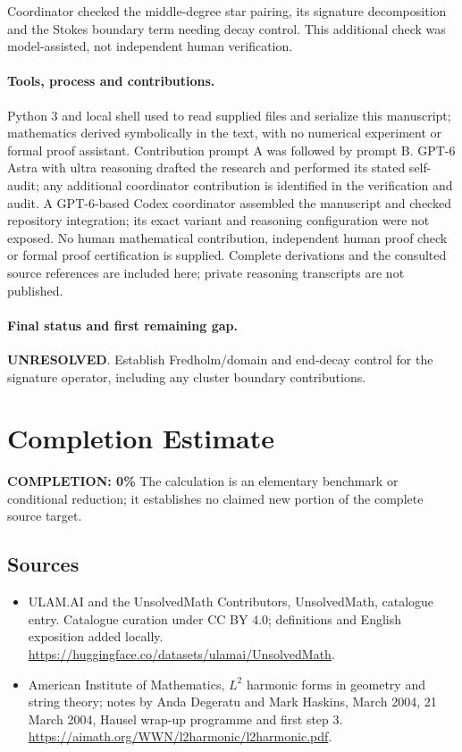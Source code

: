 \documentclass[11pt]{article}
\begin{document}
Coordinator checked the middle-degree star pairing, its signature decomposition and the Stokes boundary term needing decay control. This additional check was model-assisted, not independent human verification.

\paragraph{Tools, process and contributions.}
Python 3 and local shell used to read supplied files and serialize this manuscript; mathematics derived symbolically in the text, with no numerical experiment or formal proof assistant. Contribution prompt A was followed by prompt B. GPT-6 Astra with ultra reasoning drafted the research and performed its stated self-audit; any additional coordinator contribution is identified in the verification and audit. A GPT-6-based Codex coordinator assembled the manuscript and checked repository integration; its exact variant and reasoning configuration were not exposed. No human mathematical contribution, independent human proof check or formal proof certification is supplied. Complete derivations and the consulted source references are included here; private reasoning transcripts are not published.

\paragraph{Final status and first remaining gap.}
\textbf{UNRESOLVED}. Establish Fredholm/domain and end-decay control for the signature operator, including any cluster boundary contributions.

\section{Completion Estimate}
\noindent\textbf{COMPLETION: 0\%}
The calculation is an elementary benchmark or conditional reduction; it establishes no claimed new portion of the complete source target.

\subsection{Sources}
\begin{itemize}
\item[\hypertarget{source:statement:1}{S1}] ULAM.AI and the UnsolvedMath Contributors, UnsolvedMath, catalogue entry. Catalogue curation under CC BY 4.0; definitions and English exposition added locally.
\url{https://huggingface.co/datasets/ulamai/UnsolvedMath}.
\item[\hypertarget{source:statement:2}{S2}] American Institute of Mathematics, $L^2$ harmonic forms in geometry and string theory; notes by Anda Degeratu and Mark Haskins, March 2004, 21 March 2004, Hausel wrap-up programme and first step 3.
\url{https://aimath.org/WWN/l2harmonic/l2harmonic.pdf}.
\end{itemize}
\label{end:statement}
\end{document}

